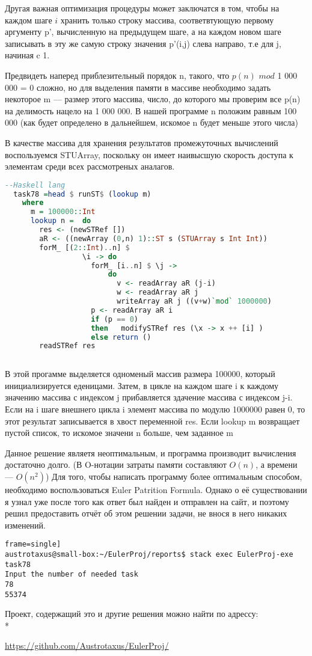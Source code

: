 \documentclass[11pt,a4paper]{article}
\begin{document}
Другая важная оптимизация процедуры может заключатся в том, чтобы на каждом шаге $i$ хранить только строку массива, соответвтующую первому аргументу p', вычисленную на предыдущем шаге, а на каждом новом шаге записывать в эту же самую строку значения p'(i,j) слева направо, т.е для j, начиная c 1.

Предвидеть наперед приблезительный порядок n, такого, что $p(n)$ $mod$  1 000 000 = 0 сложно, но для выделения памяти в массиве необходимо задать некоторое m --- размер этого массива, число, до которого мы проверим все p(n) на делимость нацело на 1 000 000. В нашей программе n положим равным 100 000 (как будет определено в дальнейшем, искомое n будет меньше этого числа)

В качестве массива для хранения результатов промежуточных вычислений воспользуемся STUArray, поскольку он имеет наивысшую  скорость доступа к элементам среди всех рассмотреных аналагов.


\begin{lstlisting}[language=Haskell, frame=single]
  --Haskell lang
  task78 =head $ runST$ (lookup m)         
    where
      m = 100000::Int
      lookup n =  do
        res <- (newSTRef [])
        aR <- ((newArray (0,n) 1)::ST s (STUArray s Int Int))
        forM_ [(2::Int)..n] $
                  \i -> do 
                    forM_ [i..n] $ \j ->
                        do
                          v <- readArray aR (j-i)
                          w <- readArray aR j
                          writeArray aR j ((v+w)`mod` 1000000)
                    p <- readArray aR i
                    if (p == 0)
                    then   modifySTRef res (\x -> x ++ [i] )
                    else return ()
        readSTRef res
                   

\end{lstlisting}

В этой прогамме выделяется одноменый массив размера 100000, который инициализируется еденицами. Затем, в цикле на каждом шаге i к каждому значению массива с индексом j прибавляется здачение массива с индексом j-i. Если на i шаге внешнего цикла i элемент массива по модулю 1000000 равен 0, то этот результат записывается в хвост переменной res. Если lookup m возвращает пустой список, то искомое значени n больше, чем заданное m

Данное решение являетя неоптимальным, и программа производит вычисления достаточно долго. (В O-нотации затраты памяти составляют $O(n)$, а времени --- $O(n^2)$) Для того, чтобы написать программу более оптимальным способом, необходимо воспользоваться Euler Patrition Formula. Однако о её существовании я узнал уже после того как ответ  был найден и отправлен на сайт, и поэтому решил предоставить отчёт об этом решении задачи, не внося в него никаких изменений.
\begin{lstlisting}frame=single]
austrotaxus@small-box:~/EulerProj/reports$ stack exec EulerProj-exe task78
Input the number of needed task
78
55374
\end{lstlisting}

Проект, содержащий это и другие решения можно найти по адрессу:\\*

\url{https://github.com/Austrotaxus/EulerProj/}
\end{document}
